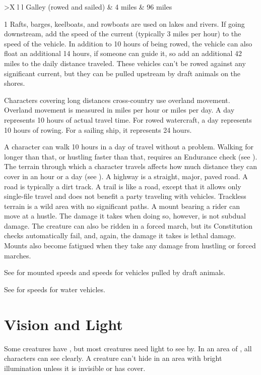 \begin{dtable}
\begin{dtabularx}{\columnwidth}{>{\lcol}X l l}
                \tind Galley (rowed and sailed) & 4 miles & 96 miles \\
            \end{dtabularx}
            1 Rafts, barges, keelboats, and rowboats are used on lakes and rivers.
            If going downstream, add the speed of the current (typically 3 miles per hour) to the speed of the vehicle. In addition to 10 hours of being rowed, the vehicle can also float an additional 14 hours, if someone can guide it, so add an additional 42 miles to the daily distance traveled. These vehicles can't be rowed against any significant current, but they can be pulled upstream by draft animals on the shores.
        \end{dtable}

        Characters covering long distances cross-country use overland movement. Overland movement is measured in miles per hour or miles per day. A day represents 10 hours of actual travel time. For rowed watercraft, a day represents 10 hours of rowing. For a sailing ship, it represents 24 hours.

         A character can walk 10 hours in a day of travel without a problem. Walking for longer than that, or hustling faster than that, requires an Endurance check (see ).
         The terrain through which a character travels affects how much distance they can cover in an hour or a day (see ).
        A highway is a straight, major, paved road.
        A road is typically a dirt track.
        A trail is like a road, except that it allows only single-file travel and does not benefit a party traveling with vehicles.
        Trackless terrain is a wild area with no significant paths.
         A mount bearing a rider can move at a hustle. The damage it takes when doing so, however, is not subdual damage. The creature can also be ridden in a forced march, but its Constitution checks automatically fail, and, again, the damage it takes is lethal damage. Mounts also become fatigued when they take any damage from hustling or forced marches.

        See  for mounted speeds and speeds for vehicles pulled by draft animals.

         See  for speeds for water vehicles.

\section{Vision and Light}\label{Vision and Light}
    Some creatures have , but most creatures need light to see by. 
    In an area of , all characters can see clearly.
    A creature can't hide in an area with bright illumination unless it is invisible or has cover.

